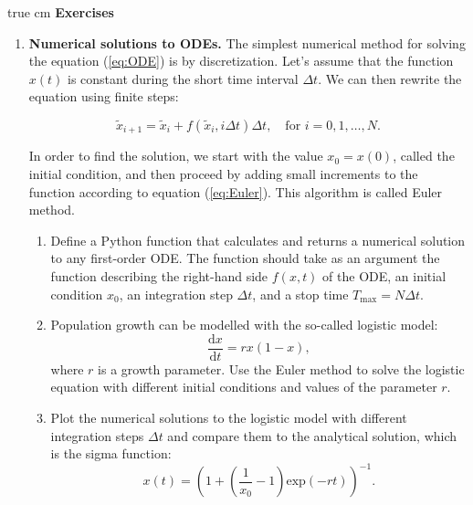 \documentclass[12pt, a4]{article}
\begin{document}
 true cm
{\bf Exercises}
\begin{enumerate}

\item \textbf{Numerical solutions to ODEs.} The simplest numerical method for 
    solving the equation (\ref{eq:ODE}) is by discretization. Let's assume 
    that the function $x(t)$ is constant
    during the short time interval $\Delta t$. We can then rewrite the equation
    using finite steps:

    \begin{equation}
        \tilde{x}_{i+1} =\tilde{x}_i + f(\tilde{x}_i, i\Delta t)\Delta t,
        \quad \text{for } i=0,1,\dots,N.
        \label{eq:Euler}
    \end{equation} 

    In order to find the solution, we start with the value $x_0=x(0)$,
    called the initial condition, and then proceed by adding
    small increments to the function according to equation
    (\ref{eq:Euler}). This algorithm is called Euler method.

    \begin{enumerate}
        \item Define a Python function that calculates and returns a
        numerical solution to any first-order ODE. The function should
        take as an argument the function describing the right-hand side
	$f(x,t)$ of the ODE, an initial condition $x_0$, 
	an integration step $\Delta t$, and a stop time 
	$T_\mathrm{max}=N\Delta t$.
     
        \item Population growth can be modelled with the so-called logistic
        model: 
	\begin{equation} 
	    \frac{\mathrm{d}x}{\mathrm{d}t}=rx(1-x), \label{eq:logistic}
        \end{equation} where $r$ is a growth parameter. Use the Euler
        method to solve the logistic equation with different
        initial conditions and values of the parameter $r$.

        \item Plot the numerical solutions to the logistic model with
        different integration steps $\Delta t$ and compare them to the
        analytical solution, which is the sigma function:
        \begin{equation}
            x(t) = \left(1 + \left( \frac{1}{x_0} - 1 \right)
                \mathrm{exp}(-rt)\right)^{-1}.
        \end{equation}


\end{enumerate}
\end{enumerate}
\end{document}
